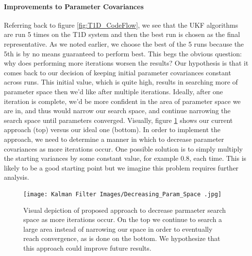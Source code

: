 \documentclass{article}
\begin{document}
\paragraph{Improvements to Parameter Covariances}
Referring back to figure \ref{fig:T1D_CodeFlow}, we see that the UKF algorithms are run 5 times on the T1D system and then the best run is chosen as the final representative. As we noted earlier, we choose the best of the 5 runs because the 5th is by no means guaranteed to perform best. This begs the obvious question: why does performing more iterations worsen the results? Our hypothesis is that it comes back to our decision of keeping initial parameter covariances constant across runs. This initial value, which is quite high, results in searching more of parameter space then we'd like after multiple iterations. Ideally, after one iteration is complete, we'd be more confident in the area of parameter space we are in, and thus would narrow our search space, and continue narrowing the search space until parameters converged. Visually, figure \ref{fig:Discussion_UKF_ChangingVariances} shows our current approach (top) versus our ideal one (bottom). In order to implement the approach, we need to determine a manner in which to decrease parameter covariances as more iterations occur. One possible solution is to simply multiply the starting variances by some constant value, for example 0.8, each time. This is likely to be a good starting point but we imagine this problem requires further analysis.

\begin{figure}[H]
    \centering
    \texttt{[image: Kalman Filter Images/Decreasing\_Param\_Space .jpg]}
    \caption{Visual depiction of proposed approach to decrease parmaeter search space as more iterations occur. On the top we continue to search a large area instead of narrowing our space in order to eventually reach convergence, as is done on the bottom. We hypothesize that this approach could improve future results.}
    \label{fig:Discussion_UKF_ChangingVariances}
\end{figure}
\end{document}
